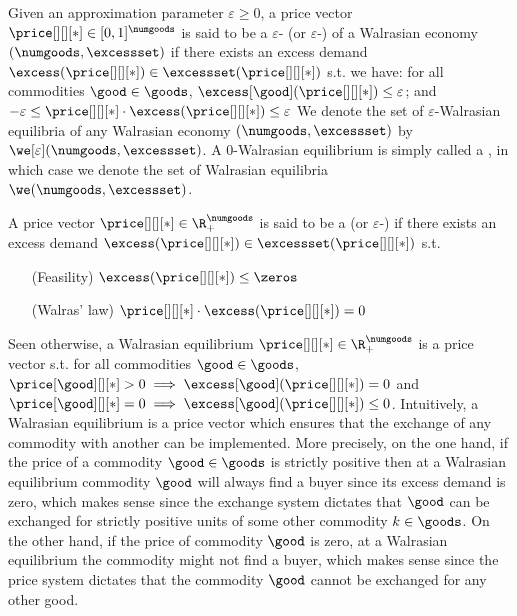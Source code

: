 Given an approximation parameter $\varepsilon \geq 0$, a price vector $\price[][][*] \in [0, 1]^\numgoods$ is said to be a $\varepsilon$- (or $\varepsilon$-)  of a Walrasian economy $(\numgoods, \excessset)$ if there exists an excess demand $\excess(\price[][][*]) \in \excessset(\price[][][*])$ s.t. we have:  for all commodities $\good \in \goods$, $\excess[\good](\price[][][*]) \leq \varepsilon$; and  $-\varepsilon \leq \price[][][*] \cdot \excess(\price[][][*]) \leq \varepsilon$
% 
We denote the set of $\varepsilon$-Walrasian equilibria of any Walrasian economy $(\numgoods, \excessset)$ by $\we[\varepsilon](\numgoods, \excessset)$.
% 
A $0$-Walrasian equilibrium is simply called a , in which case we denote the set of Walrasian equilibria $\we(\numgoods, \excessset)$.
% 
\begin{definition}
    A price vector $\price[][][*] \in \R^\numgoods_+$ is said to be a  (or $\varepsilon$-)  \cite{walras} if there exists an excess demand $\excess(\price[][][*]) \in \excessset(\price[][][*])$ s.t. 
    \begin{enumerate}[leftmargin=5cm, itemsep=0cm, labelsep=0.5cm]
        \item[{(Feasility)}] $\excess(\price[][][*]) \leq \zeros$
        \item[{(Walras' law)}] $\price[][][*] \cdot \excess(\price[][][*]) = 0$
    \end{enumerate}
\end{definition}
\fi
% 
Seen otherwise, a Walrasian equilibrium $\price[][][*] \in \R^\numgoods_+$ is a price vector s.t.
for all commodities $\good \in \goods$, $\price[\good][][*] > 0 \implies  \excess[\good](\price[][][*]) = 0$ and $\price[\good][][*] = 0 \implies \excess[\good](\price[][][*]) \leq 0$. 
Intuitively, a Walrasian equilibrium is a price vector which ensures that the exchange of any commodity with another can be implemented. More precisely, on the one hand, if the price of a commodity $\good \in \goods$ is strictly positive then at a Walrasian equilibrium commodity $\good$ will always find a buyer since its excess demand is zero, which makes sense since the exchange system dictates that $\good$ can be exchanged for strictly positive units of some other commodity $k \in \goods$. On the other hand, if the price of commodity $\good$ is zero, at a Walrasian equilibrium the commodity might not find a buyer, which makes sense since the price system dictates that the commodity $\good$ cannot be exchanged for any other good.
